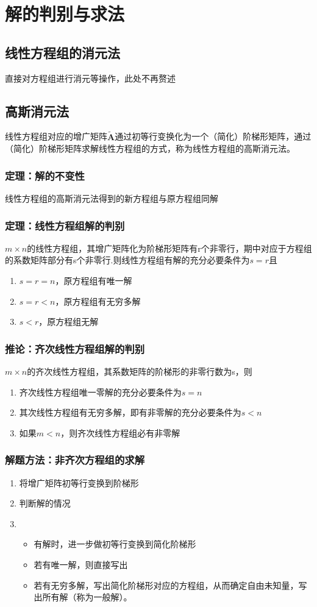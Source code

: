 \documentclass[12pt,oneside]{ctexbook}
\begin{document}
\chapter{解的判别与求法}
\section{线性方程组的消元法} 直接对方程组进行消元等操作，此处不再赘述
\section{高斯消元法} 线性方程组对应的增广矩阵\(\mathbf {\tilde A}\)通过初等行变换化为一个（简化）阶梯形矩阵，通过（简化）阶梯形矩阵求解线性方程组的方式，称为线性方程组的高斯消元法。
\subsection{定理：解的不变性} 线性方程组的高斯消元法得到的新方程组与原方程组同解
\subsection{定理：线性方程组解的判别} \(m \times n\)的线性方程组，其增广矩阵化为阶梯形矩阵有r个非零行，期中对应于方程组的系数矩阵部分有s个非零行.则线性方程组有解的充分必要条件为\(s=r\)且
\begin{enumerate}
    \item \(s=r=n\)，原方程组有唯一解
    \item \(s=r<n\)，原方程组有无穷多解
    \item \(s<r\)，原方程组无解
\end{enumerate}
\subsection{推论：齐次线性方程组解的判别} \(m \times n\)的齐次线性方程组，其系数矩阵的阶梯形的非零行数为s，则
\begin{enumerate}
    \item 齐次线性方程组唯一零解的充分必要条件为\(s=n\)
    \item 其次线性方程组有无穷多解，即有非零解的充分必要条件为\(s<n\)
    \item 如果\(m<n\)，则齐次线性方程组必有非零解
\end{enumerate}
\subsection{解题方法：非齐次方程组的求解}
\begin{enumerate}
    \item 将增广矩阵初等行变换到阶梯形
    \item 判断解的情况
    \item {\begin{itemize}
        \item 有解时，进一步做初等行变换到简化阶梯形
        \item 若有唯一解，则直接写出
        \item 若有无穷多解，写出简化阶梯形对应的方程组，从而确定自由未知量，写出所有解（称为一般解）。
        \end{itemize}}
\end{enumerate}
\end{document}
